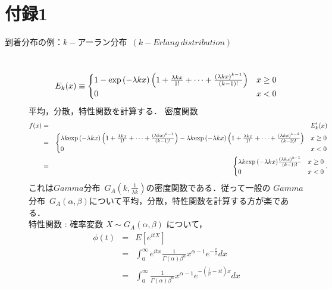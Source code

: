 \documentclass[a4j,papersize,disablejfam,slide,14pt]{jsarticle}
\def\exp#1{\mbox{${\rm exp} \left( #1 \right)$}} %
\begin{document}
\section{付録1}
	\begin{description}
    	\item[到着分布の例：$k-$アーラン分布\ $(k-Erlang\ distribution)$]\mbox{}\\
    		\begin{equation}
    			E_k(x) \equiv
        		\begin{cases}
        			1 - \exp{-\lambda k x} \left( 1 + \frac{\lambda k x}{1!} + \cdots + \frac{(\lambda k x)^{k-1}}{(k-1)!} \right) & \text{$x \geq 0$}\\
    				0 & \text{$x < 0$}
        		\end{cases}
    		\end{equation}
        平均，分散，特性関数を計算する．
        密度関数
        \begin{eqnarray}
            f(x) &=& E_k'(x) \\&=& 
            \begin{cases}
        			\lambda k \exp{-\lambda k x} \left( 1 + \frac{\lambda k x}{1!} + \cdots + \frac{(\lambda k x)^{k-1}}{(k-1)!} \right)
                    - \lambda k \exp{-\lambda k x} \left( 1 + \frac{\lambda k x}{1!} + \cdots + \frac{(\lambda k x)^{k-2}}{(k-2)!} \right) & \text{$x \geq 0$}\\
    				0 & \text{$x < 0$}
        	\end{cases} 
            \\&=&
            \begin{cases}
        			\lambda k \exp{-\lambda k x} \frac{(\lambda k x)^{k-1}}{(k-1)!} & \text{$x \geq 0$}\\
    				0 & \text{$x < 0$}
        	\end{cases}.
        \end{eqnarray}
        これは$Gamma$分布\ $G_A(k, \frac{1}{\lambda k})$の密度関数である．従って一般の
        $Gamma$分布\ $G_A(\alpha, \beta)$について平均，分散，特性関数を計算する方が楽である．\\
        特性関数 : 確率変数 $X \sim G_A(\alpha, \beta)$ について，
        \begin{eqnarray}
			\phi(t) &=& E[e^{itX}] \\
			&=& \int_{0}^{\infty} e^{itx} \frac{1}{\Gamma(\alpha)\beta^\alpha} x^{\alpha-1} e^{-\frac{x}{\beta}} dx \\
			&=& \int_{0}^{\infty} \frac{1}{\Gamma(\alpha)\beta^\alpha} x^{\alpha-1} e^{-(\frac{1}{\beta}-it)x} dx	\\

\end{eqnarray}
\end{description}
\end{document}
